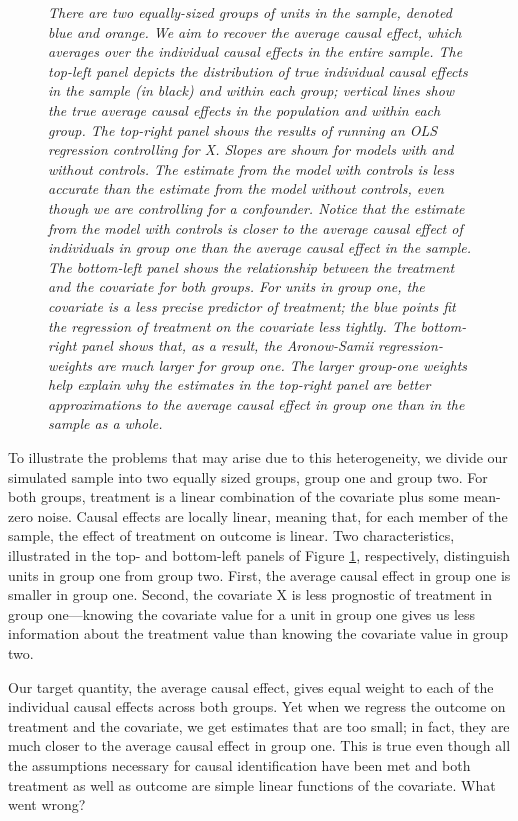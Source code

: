 \documentclass[hidelinks,11pt]{article}
\begin{document}
\begin{figure}
  \caption{\emph{There are two equally-sized groups of units in the sample, denoted blue and orange. We aim to recover the average causal effect, which averages over the individual causal effects in the entire sample. The top-left panel depicts the distribution of true individual causal effects in the sample (in black) and within each group; vertical lines show the true average causal effects in the population and within each group. The top-right panel shows the results of running an OLS regression controlling for X. Slopes are shown for models with and without controls. The estimate from the model with controls is less accurate than the estimate from the model without controls, even though we are controlling for a confounder. Notice that the estimate from the model with controls is closer to the average causal effect of individuals in group one than the average causal effect in the sample. The bottom-left panel shows the relationship between the treatment and the covariate for both groups. For units in group one, the covariate is a less precise predictor of treatment; the blue points fit the regression of treatment on the covariate less tightly. The bottom-right panel shows that, as a result, the Aronow-Samii regression-weights are much larger for group one. The larger group-one weights help explain why the estimates in the top-right panel are better approximations to the average causal effect in group one than in the sample as a whole.}}
  \label{fig_1_a}
\end{figure}

To illustrate the problems that may arise due to this heterogeneity, we divide our simulated sample into two equally sized groups, group one and group two. For both groups, treatment is a linear combination of the covariate plus some mean-zero noise. Causal effects are locally linear, meaning that, for each member of the sample, the effect of treatment on outcome is linear. Two characteristics, illustrated in the top- and bottom-left panels of Figure \ref{fig_1_a}, respectively, distinguish units in group one from group two. First, the average causal effect in group one is smaller in group one. Second, the covariate X is less prognostic of treatment in group one---knowing the covariate value for a unit in group one gives us less information about the treatment value than knowing the covariate value in group two.

Our target quantity, the average causal effect, gives equal weight to each of the individual causal effects across both groups. Yet when we regress the outcome on treatment and the covariate, we get estimates that are too small; in fact, they are much closer to the average causal effect in group one. This is true even though all the assumptions necessary for causal identification have been met and both treatment as well as outcome are simple linear functions of the covariate. What went wrong?
\end{document}
